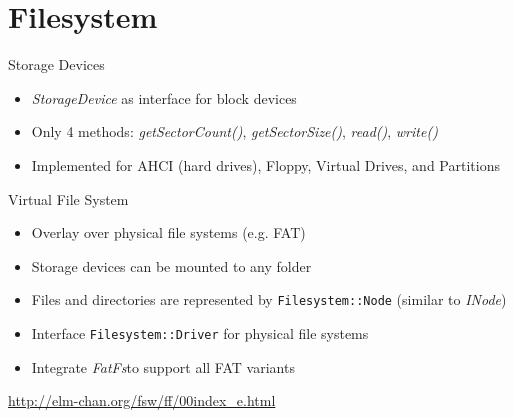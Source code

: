 \section{Filesystem}

\begin{frame}{Storage Devices}
	\begin{itemize}
		\setlength\itemsep{1em}
		\item \textit{StorageDevice} as interface for block devices
		\item Only 4 methods: \textit{getSectorCount()}, \textit{getSectorSize()}, \textit{read()}, \textit{write()}
		\item Implemented for AHCI (hard drives), Floppy, Virtual Drives, and Partitions
	\end{itemize}	
\end{frame}

\begin{frame}{Virtual File System}
	\begin{itemize}
		\setlength\itemsep{1em}
		\item Overlay over physical file systems (e.g. FAT)
		\item Storage devices can be mounted to any folder
		\item Files and directories are represented by \texttt{Filesystem::Node} (similar to \textit{INode})
		\item Interface \texttt{Filesystem::Driver} for physical file systems
		\item Integrate \textit{FatFs}\footnotemark[1] to support all FAT variants
	\end{itemize}
	\vspace{3.0em}
	\footnotemark[1]\footnotesize{\url{http://elm-chan.org/fsw/ff/00index_e.html}}
\end{frame}

